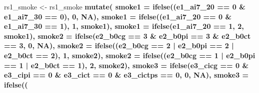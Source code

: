 \documentclass[]{book}
\newenvironment{Shaded}{\begin{snugshade}}{\end{snugshade}}
\newcommand{\DataTypeTok}[1]{\textcolor[rgb]{0.13,0.29,0.53}{#1}}
\newcommand{\DecValTok}[1]{\textcolor[rgb]{0.00,0.00,0.81}{#1}}
\newcommand{\KeywordTok}[1]{\textcolor[rgb]{0.13,0.29,0.53}{\textbf{#1}}}
\newcommand{\NormalTok}[1]{#1}
\newcommand{\OperatorTok}[1]{\textcolor[rgb]{0.81,0.36,0.00}{\textbf{#1}}}
\newcommand{\OtherTok}[1]{\textcolor[rgb]{0.56,0.35,0.01}{#1}}
\newcommand{\StringTok}[1]{\textcolor[rgb]{0.31,0.60,0.02}{#1}}
\begin{document}
\begin{Shaded}
\begin{Highlighting}[]
\NormalTok{rs1_smoke <-}\StringTok{ }\NormalTok{rs1_smoke }\OperatorTok{%
\StringTok{  }\KeywordTok{mutate}\NormalTok{(}
    \DataTypeTok{smoke1 =} \KeywordTok{ifelse}\NormalTok{((e1_ai7_}\DecValTok{20} \OperatorTok{==}\StringTok{ }\DecValTok{0} \OperatorTok{&}\StringTok{ }\NormalTok{e1_ai7_}\DecValTok{30} \OperatorTok{==}\StringTok{ }\DecValTok{0}\NormalTok{), }\DecValTok{0}\NormalTok{, }\OtherTok{NA}\NormalTok{),}
    \DataTypeTok{smoke1 =} \KeywordTok{ifelse}\NormalTok{((e1_ai7_}\DecValTok{20} \OperatorTok{==}\StringTok{ }\DecValTok{0} \OperatorTok{&}\StringTok{ }\NormalTok{e1_ai7_}\DecValTok{30} \OperatorTok{==}\StringTok{ }\DecValTok{1}\NormalTok{), }\DecValTok{1}\NormalTok{, smoke1),}
    \DataTypeTok{smoke1 =} \KeywordTok{ifelse}\NormalTok{(e1_ai7_}\DecValTok{20} \OperatorTok{==}\StringTok{ }\DecValTok{1}\NormalTok{, }\DecValTok{2}\NormalTok{, smoke1),}
    \DataTypeTok{smoke2 =} \KeywordTok{ifelse}\NormalTok{(e2_b0cg }\OperatorTok{==}\StringTok{ }\DecValTok{3} \OperatorTok{&}
\StringTok{                      }\NormalTok{e2_b0pi }\OperatorTok{==}\StringTok{ }\DecValTok{3} \OperatorTok{&}\StringTok{ }\NormalTok{e2_b0ct }\OperatorTok{==}\StringTok{ }\DecValTok{3}\NormalTok{, }\DecValTok{0}\NormalTok{, }\OtherTok{NA}\NormalTok{),}
    \DataTypeTok{smoke2 =} \KeywordTok{ifelse}\NormalTok{((e2_b0cg }\OperatorTok{==}\StringTok{ }\DecValTok{2} \OperatorTok{|}
\StringTok{                       }\NormalTok{e2_b0pi }\OperatorTok{==}\StringTok{ }\DecValTok{2} \OperatorTok{|}\StringTok{ }\NormalTok{e2_b0ct }\OperatorTok{==}\StringTok{ }\DecValTok{2}\NormalTok{), }\DecValTok{1}\NormalTok{, smoke2),}
    \DataTypeTok{smoke2 =} \KeywordTok{ifelse}\NormalTok{((e2_b0cg }\OperatorTok{==}\StringTok{ }\DecValTok{1} \OperatorTok{|}
\StringTok{                       }\NormalTok{e2_b0pi }\OperatorTok{==}\StringTok{ }\DecValTok{1} \OperatorTok{|}\StringTok{ }\NormalTok{e2_b0ct }\OperatorTok{==}\StringTok{ }\DecValTok{1}\NormalTok{), }\DecValTok{2}\NormalTok{, smoke2),}
    \DataTypeTok{smoke3 =} \KeywordTok{ifelse}\NormalTok{(e3_cicg }\OperatorTok{==}\StringTok{ }\DecValTok{0} \OperatorTok{&}
\StringTok{                      }\NormalTok{e3_cipi }\OperatorTok{==}\StringTok{ }\DecValTok{0} \OperatorTok{&}\StringTok{ }\NormalTok{e3_cict }\OperatorTok{==}\StringTok{ }\DecValTok{0} \OperatorTok{&}\StringTok{ }\NormalTok{e3_cictps }\OperatorTok{==}\StringTok{ }\DecValTok{0}\NormalTok{, }\DecValTok{0}\NormalTok{, }\OtherTok{NA}\NormalTok{),}
    \DataTypeTok{smoke3 =} \KeywordTok{ifelse}\NormalTok{((}
}
\end{Highlighting}
\end{Shaded}
\end{document}
